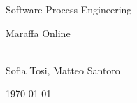 \documentclass[a4paper,11pt,oneside]{book}
\begin{document}
    
    \frontmatter
    
    \begin{titlepage}      
        \begin{center}
            {\LARGE Software Process Engineering}\\[2cm]
			
            \linespread{1.2}\huge {
                Maraffa Online
            
            }
            \linespread{1}~\\[2cm]
            {\Large 
                Sofia Tosi, Matteo Santoro
            }\\[1cm] 
            

            
            \vfill
            
            
            \today %
        \end{center}
    \end{titlepage}
       
    
    
\end{document}
